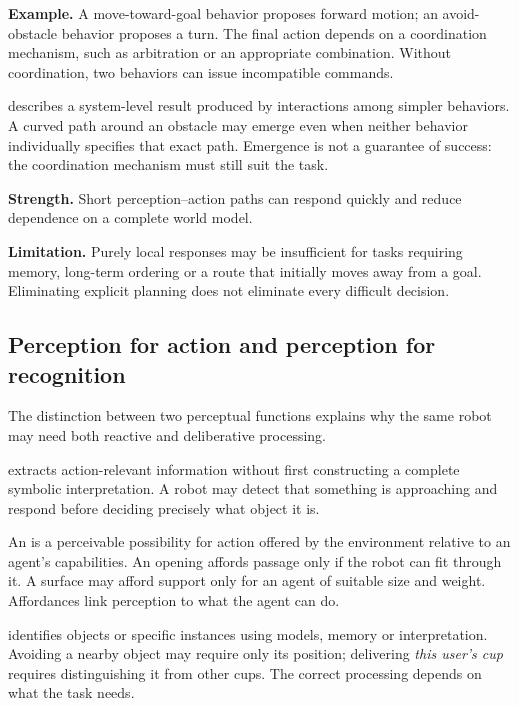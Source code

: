 \textbf{Example.} A move-toward-goal behavior proposes forward motion; an avoid-obstacle behavior proposes a turn. The final action depends on a coordination mechanism, such as arbitration or an appropriate combination. Without coordination, two behaviors can issue incompatible commands.

 describes a system-level result produced by interactions among simpler behaviors. A curved path around an obstacle may emerge even when neither behavior individually specifies that exact path. Emergence is not a guarantee of success: the coordination mechanism must still suit the task.

\textbf{Strength.} Short perception--action paths can respond quickly and reduce dependence on a complete world model.

\textbf{Limitation.} Purely local responses may be insufficient for tasks requiring memory, long-term ordering or a route that initially moves away from a goal. Eliminating explicit planning does not eliminate every difficult decision.


\subsection{Perception for action and perception for recognition}
The distinction between two perceptual functions explains why the same robot may need both reactive and deliberative processing.

 extracts action-relevant information without first constructing a complete symbolic interpretation. A robot may detect that something is approaching and respond before deciding precisely what object it is.

An  is a perceivable possibility for action offered by the environment relative to an agent's capabilities. An opening affords passage only if the robot can fit through it. A surface may afford support only for an agent of suitable size and weight. Affordances link perception to what the agent can do.

 identifies objects or specific instances using models, memory or interpretation. Avoiding a nearby object may require only its position; delivering \emph{this user's cup} requires distinguishing it from other cups. The correct processing depends on what the task needs.


